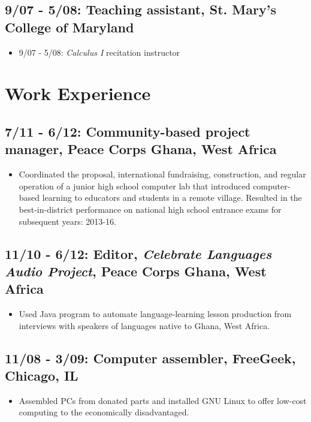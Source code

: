 \documentclass[11pt]{cv}
\begin{document}
\subsection*{9/07 - 5/08: Teaching assistant, St. Mary's College of Maryland}
\label{sec:orgheadline15}
\begin{itemize}
\item 9/07 - 5/08: \emph{Calculus I} recitation instructor\\
\end{itemize}
\section*{Work Experience}
\label{sec:orgheadline20}
\subsection*{7/11 - 6/12: Community-based project manager, Peace Corps Ghana, West Africa}
\label{sec:orgheadline17}
\begin{itemize}
\item Coordinated the proposal, international fundraising, construction, and regular operation of a junior high school computer lab that introduced computer-based learning to educators and students in a remote village. Resulted in the best-in-district performance on national high school entrance exams for subsequent years: 2013-16.\\
\end{itemize}
\subsection*{11/10 - 6/12: Editor, \emph{Celebrate Languages Audio Project}, Peace Corps Ghana, West Africa}
\label{sec:orgheadline18}
\begin{itemize}
\item Used Java program to automate language-learning lesson production from interviews with speakers of languages native to Ghana, West Africa.\\
\end{itemize}
\subsection*{11/08 - 3/09: Computer assembler, FreeGeek, Chicago, IL}
\label{sec:orgheadline19}
\begin{itemize}
\item Assembled PCs from donated parts and installed GNU Linux to offer low-cost computing to the economically disadvantaged.\\
\end{itemize}
\end{document}
